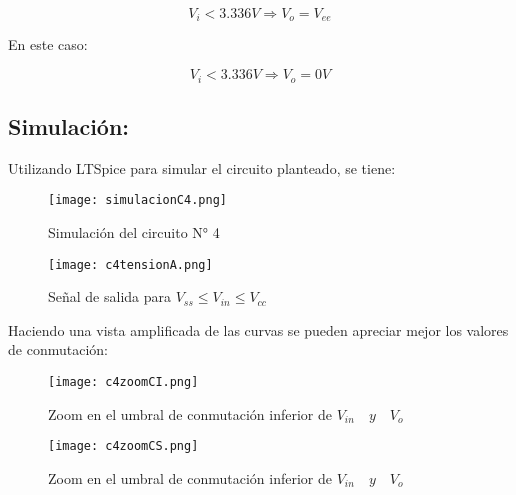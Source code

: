 \[V_i < 3.336V \Rightarrow V_o = V_{ee}\]

En este caso:

\[V_i < 3.336V \Rightarrow V_o = 0V\]

\vspace{1em}

\newpage

\subsection{Simulación: }

\vspace{1em}

Utilizando LTSpice para simular el circuito planteado, se tiene:

\vspace{1em}

 \begin{figure}[h!]
      \centering
      \texttt{[image: simulacionC4.png]}
      \caption{Simulación del circuito N° 4}
      \label{fig:simulacionC4}
 \end{figure}
 
\vspace{1em}

 \begin{figure}[h!]
        \centering
 	 \texttt{[image: c4tensionA.png]}
	  \caption{Señal de salida para $V_{ss} \leq V_{in} \leq V_{cc}$}
	  \label{fig:simulacionC4}
 \end{figure}

\vspace{1em}

Haciendo una vista amplificada de las curvas se pueden apreciar mejor los valores de conmutación:

\begin{figure}[h!]
     \centering
	 \texttt{[image: c4zoomCI.png]}
	 \caption{Zoom en el umbral de conmutación inferior de $V_{in} \quad y \quad V_o$}
	 \label{fig:simulacionC4}
\end{figure}

\begin{figure}[h!]
     \centering
	 \texttt{[image: c4zoomCS.png]}
	 \caption{Zoom en el umbral de conmutación inferior de $V_{in} \quad y \quad V_o$}
	 \label{fig:simulacionC4}
\end{figure}


\vspace{1em}

